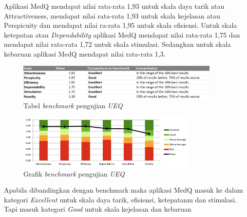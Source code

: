 Aplikasi MedQ mendapat nilai rata-rata 1,93 untuk skala daya tarik atau 
Attractiveness, mendapat nilai rata-rata 1,93 untuk skala kejelasan atau 
Perspicuity dan mendapat nilai ra-rata 1,95 untuk skala efisiensi. Untuk skala 
ketepatan atau \textit{Dependability} aplikasi MedQ mendapat nilai rata-rata 1,75 dan 
mendapat nilai rata-rata 1,72 untuk skala stimulasi. Sedangkan untuk skala 
kebaruan aplikasi MedQ mendapat nilai rata-rata 1,3. 
\begin{figure}[H]
	\centering
	\includegraphics[width=0.9\textwidth]{contents/chapter-4/images/BenchMark.png}
	\caption{Tabel \textit{benchmark} pengujian \textit{UEQ}}
	\label{Fig : benchmark}
\end{figure}
\begin{figure}[H]
	\centering
	\includegraphics[width=0.8\textwidth]{contents/chapter-4/images/BenchMark-graph.png}
	\caption{Grafik \textit{benchmark} pengujian \textit{UEQ}}
	\label{Fig : benchmark-graph}
\end{figure}
Apabila dibandingkan dengan benchmark maka aplikasi MedQ masuk ke 
dalam kategori \textit{Excellent} untuk skala daya tarik, efisiensi, ketepatanm dan stimulasi.
Tapi masuk kategori \textit{Good} untuk skala kejelasan dan kebaruan